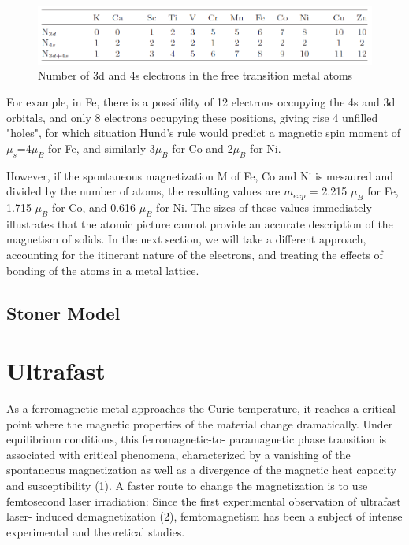 \begin{figure}
	\begin{center}
		\includegraphics[width=150mm]{figs/TransitionMetalValenceShells}
	\end{center}
\caption{Number of 3d and 4s electrons in the free transition metal atoms}
\label{TransMetalUnpE}
\end{figure}

For example, in Fe, there is a possibility of 12 electrons occupying the 4s and 3d orbitals, and only 8 electrons occupying these positions, giving rise 4 unfilled "holes", for which situation Hund's rule would predict a magnetic spin moment of $\mu_s$=4$\mu_B$ for Fe, and similarly 3$\mu_B$ for Co and 2$\mu_B$ for Ni.

However, if the spontaneous magnetization M of Fe, Co and Ni is mesaured and divided by the number of atoms, the resulting values are $m_{exp}$ = 2.215 $\mu_B$ for Fe, 1.715 $\mu_B$ for Co, and 0.616 $\mu_B$ for Ni. The sizes of these values immediately illustrates that the atomic picture cannot provide an accurate description of the magnetism of solids. In the next section, we will take a different approach, accounting for the itinerant nature of the electrons, and treating the effects of bonding of the atoms in a metal lattice.

\subsection{Stoner Model}


\section{Ultrafast}
As a ferromagnetic metal approaches the Curie temperature, it reaches a critical point where the magnetic properties of the material change dramatically. Under equilibrium conditions, this ferromagnetic-to- paramagnetic phase transition is associated with critical phenomena, characterized by a vanishing of the spontaneous magnetization as well as a divergence of the magnetic heat capacity and susceptibility (1). A faster route to change the magnetization is to use femtosecond laser irradiation: Since the first experimental observation of ultrafast laser- induced demagnetization (2), femtomagnetism has been a subject of intense experimental and theoretical studies.

